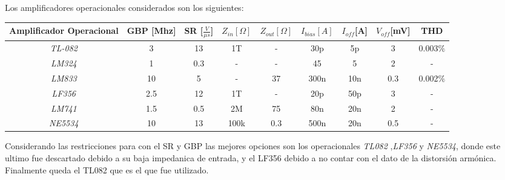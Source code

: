 Los amplificadores operacionales considerados son los siguientes:
\begin{table}[H]
\centering
\begin{tabular}{ccccccccc}
\textbf{Amplificador Operacional} & \textbf{GBP [Mhz]} & \textbf{SR [$\frac{V}{\mu s}$]} & \textbf{$Z_{in} [\Omega]$} & \textbf{$Z_{out}[\Omega]$} & \textbf{$I_{bias}[A]$} & \textbf{$I_{off}$[A]} & \textbf{$V_{off}$[mV]} & \textbf{THD} \\ \hline
\textit{TL-082}                   & 3                  & 13                              & 1T                         & -                          & 30p                 & 5p                    & 3                      & 0.003$\%$    \\
\textit{LM324}                    & 1                  & 0.3                             & -                          & -                          & 45                  & 5                     & 2                      & -            \\
\textit{LM833}                    & 10                 & 5                               & -                          & 37                         & 300n                & 10n                   & 0.3                    & 0.002$\%$    \\
\textit{LF356}                    & 2.5                & 12                              & 1T                         & -                          & 20p                 & 50p                   & 3                      & -            \\
\textit{LM741}                    & 1.5                & 0.5                             & 2M                         & 75                         & 80n                 & 20n                   & 2                      & -            \\
\textit{NE5534}                   & 10                 & 13                              & 100k                       & 0.3                        & 500n                & 20n                   & 0.5                    & -           
\end{tabular}
\end{table}

Considerando las restricciones para con el SR y GBP las mejores opciones son los operacionales \emph{TL082} ,\emph{LF356} y \emph{NE5534}, donde este ultimo fue descartado debido a su baja impedanica de entrada, y el LF356 debido a no contar con el dato de la distorsión armónica.
Finalmente queda el TL082 que es el que fue utilizado.
